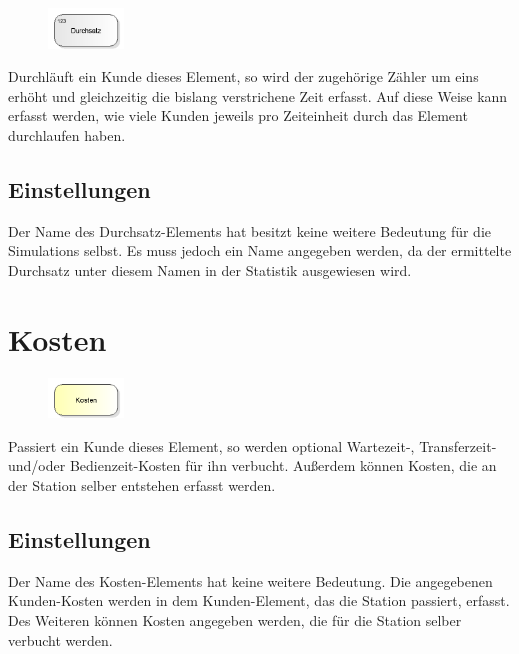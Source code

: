 \begin{figure}
\vspace{-22pt}
\includegraphics[width=2cm]{imageModelElementThroughput.png}
\vspace{-22pt}
\end{figure}

Durchläuft ein Kunde dieses Element, so wird der zugehörige Zähler um eins erhöht und gleichzeitig die
bislang verstrichene Zeit erfasst. Auf diese Weise kann erfasst werden,
wie viele Kunden jeweils pro Zeiteinheit durch das Element durchlaufen haben.

\subsection*{Einstellungen}

Der Name des Durchsatz-Elements hat besitzt keine weitere Bedeutung für die Simulations selbst.
Es muss jedoch ein Name angegeben werden, da der ermittelte Durchsatz unter diesem Namen in der
Statistik ausgewiesen wird.


\section{Kosten}
\label{ref:ModelElementCosts}

\begin{figure}
\vspace{-22pt}
\includegraphics[width=2cm]{imageModelElementCosts.png}
\vspace{-22pt}
\end{figure}

Passiert ein Kunde dieses Element, so werden optional Wartezeit-, Transferzeit- und/oder Bedienzeit-Kosten für ihn
verbucht. Außerdem können Kosten, die an der Station selber entstehen erfasst werden.

\subsection*{Einstellungen}

Der Name des Kosten-Elements hat keine weitere Bedeutung. Die angegebenen Kunden-Kosten werden in dem Kunden-Element,
das die Station passiert, erfasst. Des Weiteren können Kosten angegeben werden, die für die Station selber verbucht
werden.


